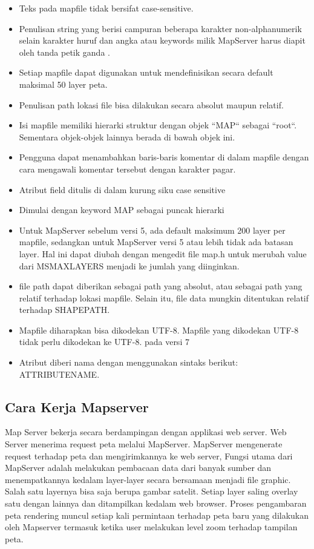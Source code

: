 		\begin{itemize}
			\item Teks pada mapfile tidak bersifat case-sensitive.
			\item Penulisan string yang berisi campuran beberapa karakter non-alphanumerik  selain karakter huruf dan angka  atau keywords milik MapServer harus diapit oleh tanda petik ganda .
			\item Setiap mapfile dapat digunakan untuk mendefinisikan secara default maksimal 50 layer peta.
			\item Penulisan path lokasi file bisa dilakukan secara absolut maupun relatif.
			\item Isi mapfile memiliki hierarki struktur dengan objek ``MAP`` sebagai ``root``. Sementara objek-objek lainnya berada di bawah objek ini.
			\item Pengguna dapat menambahkan baris-baris komentar di dalam mapfile dengan cara mengawali komentar tersebut dengan karakter pagar.
			\item Atribut field ditulis di dalam kurung siku  case sensitive 
			\item Dimulai dengan keyword MAP sebagai puncak hierarki
			\item Untuk MapServer sebelum versi 5, ada default maksimum 200 layer per mapfile, 
	      			sedangkan untuk MapServer versi 5 atau lebih tidak ada batasan layer. 
              			Hal ini dapat diubah dengan mengedit file map.h untuk merubah value dari MSMAXLAYERS menjadi ke jumlah yang diinginkan.
			\item file path dapat diberikan sebagai path yang absolut, atau sebagai path yang relatif terhadap lokasi mapfile. Selain itu, file data mungkin ditentukan relatif terhadap SHAPEPATH.
			\item Mapfile diharapkan bisa dikodekan UTF-8. Mapfile yang dikodekan UTF-8 tidak perlu dikodekan ke UTF-8.  pada versi 7 
			\item Atribut diberi nama dengan menggunakan sintaks berikut: ATTRIBUTENAME.			  
		\end{itemize}

\subsection{Cara Kerja Mapserver}
Map Server bekerja secara berdampingan dengan applikasi web server. Web Server menerima request peta melalui MapServer. 
MapServer mengenerate request terhadap peta dan mengirimkannya ke web server,
Fungsi utama dari MapServer adalah melakukan pembacaan data dari banyak sumber dan menempatkannya kedalam layer-layer secara bersamaan menjadi file graphic.
Salah satu layernya bisa saja berupa gambar satelit. Setiap layer saling overlay satu dengan lainnya dan ditampilkan kedalam web browser.
Proses pengambaran peta rendering muncul setiap kali permintaan terhadap peta baru yang dilakukan oleh Mapserver termasuk ketika user melakukan level zoom terhadap tampilan peta.


